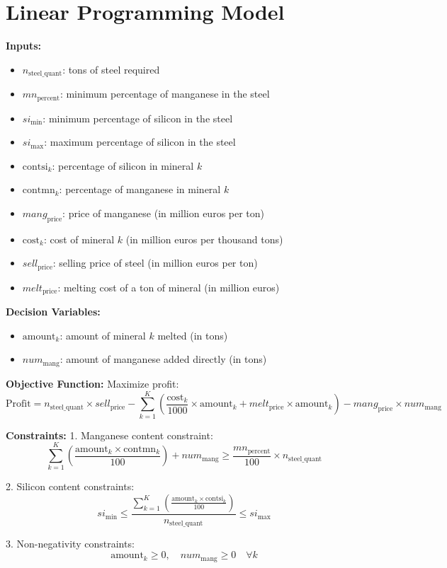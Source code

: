 \documentclass{article}
\begin{document}
\section*{Linear Programming Model}

\textbf{Inputs:}
\begin{itemize}
    \item \( n_{\text{steel\_quant}} \): tons of steel required
    \item \( mn_{\text{percent}} \): minimum percentage of manganese in the steel
    \item \( si_{\text{min}} \): minimum percentage of silicon in the steel
    \item \( si_{\text{max}} \): maximum percentage of silicon in the steel
    \item \( \text{contsi}_k \): percentage of silicon in mineral \( k \)
    \item \( \text{contmn}_k \): percentage of manganese in mineral \( k \)
    \item \( mang_{\text{price}} \): price of manganese (in million euros per ton)
    \item \( \text{cost}_k \): cost of mineral \( k \) (in million euros per thousand tons)
    \item \( sell_{\text{price}} \): selling price of steel (in million euros per ton)
    \item \( melt_{\text{price}} \): melting cost of a ton of mineral (in million euros)
\end{itemize}

\textbf{Decision Variables:}
\begin{itemize}
    \item \( \text{amount}_k \): amount of mineral \( k \) melted (in tons)
    \item \( num_{\text{mang}} \): amount of manganese added directly (in tons)
\end{itemize}

\textbf{Objective Function:}
Maximize profit:
\[
\text{Profit} = n_{\text{steel\_quant}} \times sell_{\text{price}} - \sum_{k=1}^{K} \left( \frac{\text{cost}_k}{1000} \times \text{amount}_k + melt_{\text{price}} \times \text{amount}_k \right) - mang_{\text{price}} \times num_{\text{mang}}
\]

\textbf{Constraints:}
1. Manganese content constraint:
\[
\sum_{k=1}^{K} \left( \frac{\text{amount}_k \times \text{contmn}_k}{100} \right) + num_{\text{mang}} \geq \frac{mn_{\text{percent}}}{100} \times n_{\text{steel\_quant}}
\]

2. Silicon content constraints:
\[
si_{\text{min}} \leq \frac{\sum_{k=1}^{K} \left( \frac{\text{amount}_k \times \text{contsi}_k}{100} \right)}{n_{\text{steel\_quant}}} \leq si_{\text{max}}
\]

3. Non-negativity constraints:
\[
\text{amount}_k \geq 0, \quad num_{\text{mang}} \geq 0 \quad \forall k
\]
\end{document}

